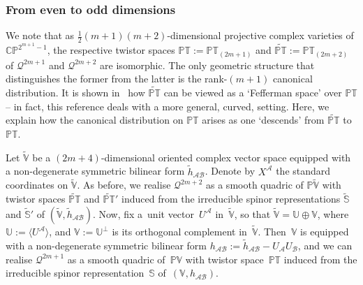 \documentclass[10pt,a4paper]{amsart}
\numberwithin{equation}{section}
\newcommand{\mc} [1]{\mathcal{#1}}
\newcommand{\PT} {\mathbb{PT}}
\newcommand{\Ss} {\mathbb{S}}
\newcommand{\Pp} {\mathbb{P}}
\newcommand{\CP} {\mathbb{CP}}
\newcommand{\V} {\mathbb{V}}
\begin{document}
\subsubsection{From even to odd dimensions}\label{sec-even-odd}
We note that as $\frac{1}{2}(m+1)(m+2)$-dimensional projective complex varieties of $\CP^{2^{m+1}-1}$, the respective twistor spaces $\PT:=\PT_{(2m+1)}$ and $\widetilde{\PT}:=\PT_{(2m+2)}$ of $\mc{Q}^{2m+1}$ and $\mc{Q}^{2m+2}$ are isomorphic. The only geometric structure that distinguishes the former from the latter is the rank-$(m+1)$ canonical distribution. It is shown in~\cite{Doubrov2010} how $\widetilde{\PT}$ can be viewed as a `Fef\/ferman space' over $\PT$ -- in fact, this reference deals with a more general, curved, setting. Here, we explain how the canonical distribution on $\PT$ arises as one `descends' from $\widetilde{\PT}$ to $\PT$.

Let $\widetilde{\V}$ be a $(2m+4)$-dimensional oriented complex vector space equipped with a non-degenerate symmetric bilinear form $\tilde{h}_{\mc{A} \mc{B}}$. Denote by $X^\mc{A}$ the standard coordinates on $\widetilde{\V}$. As before, we realise $\mc{Q}^{2m+2}$ as a smooth quadric of $\Pp \widetilde{\V}$ with twistor spaces $\widetilde{\PT}$ and $\widetilde{\PT}'$ induced from the irreducible spinor representations $\widetilde{\Ss}$ and $\widetilde{\Ss}'$ of $(\widetilde{\V}, \tilde{h}_{\mc{A} \mc{B}})$. Now, f\/ix a~unit vector~$U^\mc{A}$ in~$\widetilde{\V}$, so that $\widetilde{\V} = \mathbb{U} \oplus \V$, where $\mathbb{U} := \langle U^\mc{A} \rangle$, and $\V:=\mathbb{U}^\perp$ is its orthogonal complement in~$\widetilde{\V}$. Then~$\V$ is equipped with a non-degenerate symmetric bilinear form $h_{\mc{A} \mc{B}} := \tilde{h}_{\mc{A} \mc{B}} - U_\mc{A} U_\mc{B}$, and we can realise $\mc{Q}^{2m+1}$ as a smooth quadric of~$\Pp \V$ with twistor space~$\PT$ induced from the irreducible spinor representation~$\Ss$ of~$(\V, h_{\mc{A} \mc{B}})$.
\end{document}
